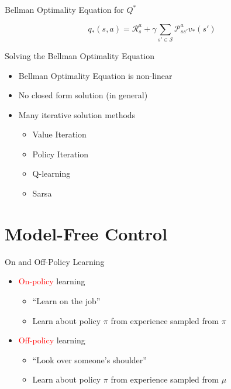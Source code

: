 \begin{frame}{Bellman Optimality Equation for $Q^*$}
\begin{center}
\end{center}
\[ q_*(s, a) = \mathcal{R}^a_s + \gamma \sum_{s' \in \mathcal{S}} \mathcal{P}^a_{ss'} v_*(s') \]
\end{frame}

\begin{frame}{Solving the Bellman Optimality Equation}
\begin{itemize}
  \item Bellman Optimality Equation is non-linear
  \item No closed form solution (in general)
  \item Many iterative solution methods
  \begin{itemize}
    \item Value Iteration
    \item Policy Iteration
    \item Q-learning
    \item Sarsa
  \end{itemize}
\end{itemize}
\end{frame}

\section{Model-Free Control}

\begin{frame}{On and Off-Policy Learning}
\begin{itemize}
  \item \textcolor{red}{On-policy} learning
  \begin{itemize}
    \item ``Learn on the job''
    \item Learn about policy $\pi$ from experience sampled from $\pi$
  \end{itemize}
  \item \textcolor{red}{Off-policy} learning
  \begin{itemize}
    \item ``Look over someone's shoulder''
    \item Learn about policy $\pi$ from experience sampled from $\mu$
  \end{itemize}
\end{itemize}
\end{frame}

